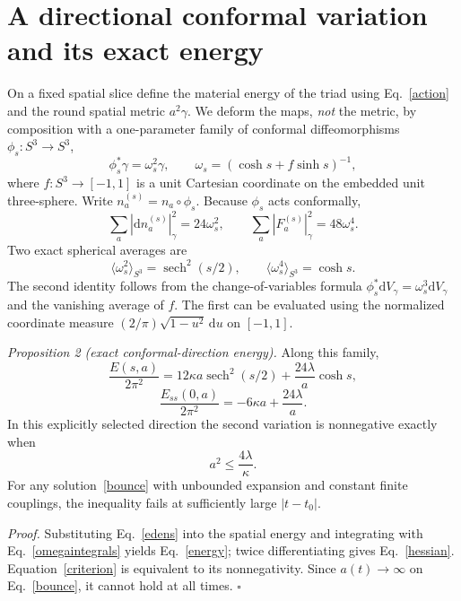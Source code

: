 \documentclass[aps,prd,reprint,longbibliography,nofootinbib,superscriptaddress]{revtex4-2}
\newcommand{\dd}{\mathrm d}
\begin{document}
\section{A directional conformal variation and its exact energy}
On a fixed spatial slice define the material energy of the triad using Eq.~\eqref{action} and the round spatial metric $a^2\gamma$. We deform the maps, \emph{not} the metric, by composition with a one-parameter family of conformal diffeomorphisms $\phi_s:S^3\to S^3$,
\begin{equation}\label{conformal}
 \phi_s^*\gamma=\omega_s^2\gamma,
 \qquad \omega_s=(\cosh s+f\sinh s)^{-1},
\end{equation}
where $f:S^3\to[-1,1]$ is a unit Cartesian coordinate on the embedded unit three-sphere. Write $n_a^{(s)}=n_a\circ\phi_s$. Because $\phi_s$ acts conformally,
\begin{equation}\label{edens}
 \sum_a|\dd n_a^{(s)}|_\gamma^2=24\omega_s^2,\qquad
 \sum_a|F_a^{(s)}|_\gamma^2=48\omega_s^4.
\end{equation}
Two exact spherical averages are
\begin{equation}\label{omegaintegrals}
 \langle\omega_s^2\rangle_{S^3}=\operatorname{sech}^2(s/2),\qquad
 \langle\omega_s^4\rangle_{S^3}=\cosh s.
\end{equation}
The second identity follows from the change-of-variables formula $\phi_s^*\dd V_\gamma=\omega_s^3\dd V_\gamma$ and the vanishing average of $f$. The first can be evaluated using the normalized coordinate measure $(2/\pi)\sqrt{1-u^2}\,\dd u$ on $[-1,1]$.

\textit{Proposition 2 (exact conformal-direction energy).} Along this family,
\begin{equation}\label{energy}
 \frac{E(s,a)}{2\pi^2}=12\kappa a\operatorname{sech}^2(s/2)
 +\frac{24\lambda}{a}\cosh s,
\end{equation}
\begin{equation}\label{hessian}
 \frac{E_{ss}(0,a)}{2\pi^2}=-6\kappa a+\frac{24\lambda}{a}.
\end{equation}
In this explicitly selected direction the second variation is nonnegative exactly when
\begin{equation}\label{criterion}
 a^2\le\frac{4\lambda}{\kappa}.
\end{equation}
For any solution~\eqref{bounce} with unbounded expansion and constant finite couplings, the inequality fails at sufficiently large $|t-t_0|$.

\textit{Proof.} Substituting Eq.~\eqref{edens} into the spatial energy and integrating with Eq.~\eqref{omegaintegrals} yields Eq.~\eqref{energy}; twice differentiating gives Eq.~\eqref{hessian}. Equation~\eqref{criterion} is equivalent to its nonnegativity. Since $a(t)\to\infty$ on Eq.~\eqref{bounce}, it cannot hold at all times. $\square$
\end{document}
